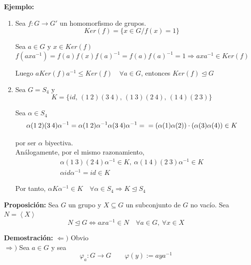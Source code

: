 \documentclass{article}
\begin{document}
\textbf{Ejemplo:}
\begin{enumerate}[(1)]
\item Sea $f:G\rightarrow G'$ un homomorfismo de grupos.
\begin{equation*}
Ker(f)=\{x\in G/f(x)=1\}
\end{equation*}

Sea $a\in G$ y $x\in Ker(f)$
\begin{equation*}
f(axa^{-1})=f(a)f(x)f(a)^{-1}=f(a)f(a)^{-1}=1 \Rightarrow axa^{-1}\in Ker(f)
\end{equation*}

Luego $aKer(f)a^{-1}\leq Ker(f) \quad \forall a\in G$, entonces $Ker(f)\unlhd G$

\item Sea $G=S_4$ y 
\begin{equation*}
K=\{id,\,(1\:2)(3\:4),\,(1\:3)(2\:4),\,(1\:4)(2\:3)\}
\end{equation*}

Sea $\alpha \in S_4$
\begin{equation*}
\alpha(1\:2)(3\:4)\alpha^{-1}=\alpha(1\:2)\alpha^{-1}\alpha(3\:4)\alpha^{-1}=\\
=(\alpha(1)\alpha(2))\cdot(\alpha(3)\alpha(4))\in K
\end{equation*}

por ser $\alpha$ biyectiva. \\

Análogamente, por el mismo razonamiento,
\begin{gather*}
\alpha(1\:3)(2\:4)\alpha^{-1}\in K,\:\alpha(1\:4)(2\:3)\alpha^{-1}\in K\\
\alpha id \alpha^{-1}=id\in K
\end{gather*}

Por tanto, $\alpha K\alpha^{-1}\in K \quad \forall\alpha\in S_4\Rightarrow K\unlhd S_4$
\end{enumerate}

\textbf{Proposición:} Sea $G$ un grupo y $X\subseteq G$ un subconjunto de $G$ no vacío. Sea $N=\left\langle X\right\rangle$
\begin{equation*}
N\unlhd G \Leftrightarrow axa^{-1}\in N \quad \forall a\in G,\: \forall x \in X
\end{equation*}

\textbf{Demostración:} $\Leftarrow)$ Obvio\\

$\Rightarrow)$ Sea $a\in G$ y sea 
\begin{equation*}
\varphi_a:G\rightarrow G \qquad \varphi(y):=aya^{-1}
\end{equation*}
\end{document}
